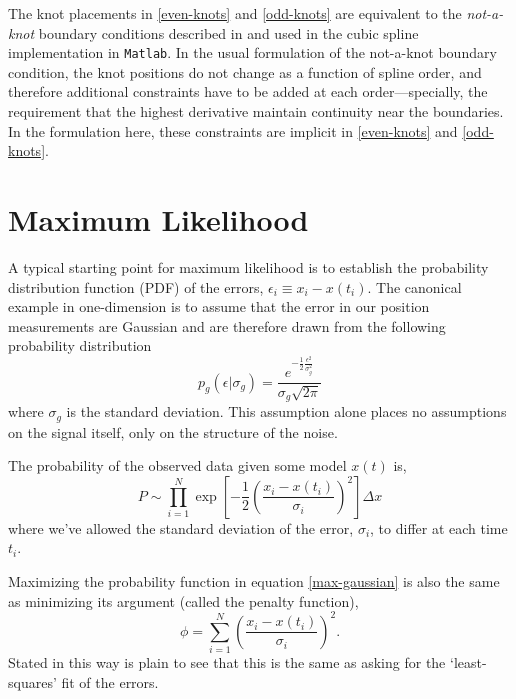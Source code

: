 \documentclass[10pt,journal]{IEEEtran}
\begin{document}
The knot placements in \ref{even-knots} and \ref{odd-knots} are equivalent to the \textit{not-a-knot} boundary conditions described in \cite{deboor1978-book} and used in the cubic spline implementation in \texttt{Matlab}. In the usual formulation of the not-a-knot boundary condition, the knot positions do not change as a function of spline order, and therefore additional constraints have to be added at each order---specially, the requirement that the highest derivative maintain continuity near the boundaries. In the formulation here, these constraints are implicit in \ref{even-knots} and \ref{odd-knots}.


%
\section{Maximum Likelihood}
\label{sec:maximum_likelihood}
%

A typical starting point for maximum likelihood is to establish the probability distribution function (PDF) of the errors, $\epsilon_i \equiv x_i - x(t_i)$. The canonical example in one-dimension is to assume that the error in our position measurements are Gaussian and are therefore drawn from the following probability distribution
\begin{equation}
\label{gaussian_pdf}
p_g(\epsilon|\sigma_g) = \frac{e^{-\frac{1}{2}\frac{\epsilon^2}{\sigma_g^2}} }{\sigma_g \sqrt{ 2 \pi}}
\end{equation}
where $\sigma_g$ is the standard deviation. This assumption alone places no assumptions on the signal itself, only on the structure of the noise.

The probability of the observed data given some model $x(t)$ is,
\begin{equation}
\label{max-gaussian}
P \sim \prod_{i=1}^{N}  \exp \left[ -\frac{1}{2} \left( \frac{x_i - x(t_i)}{\sigma_i} \right)^2 \right] \Delta x
\end{equation}
where we've allowed the standard deviation of the error, $\sigma_i$, to differ at each time $t_i$.

Maximizing the probability function in equation \ref{max-gaussian} is also the same as minimizing its argument (called the penalty function),
\begin{equation}
\label{least-squares}
\phi = \sum_{i=1}^{N} \left( \frac{x_i - x(t_i)}{\sigma_i} \right)^2 .
\end{equation}
Stated in this way is plain to see that this is the same as asking for the `least-squares' fit of the errors.
\end{document}
